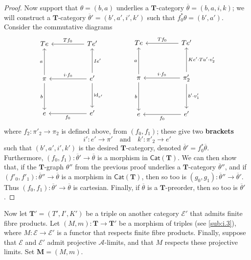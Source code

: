 \documentclass[fleqn]{article}
\newcommand{\unsure}[1]{{\color{purple}\textbf{#1}}}
\newcommand{\id}{\mathrm{id}}
\newcommand{\TT}{\mathbf{T}}
\newcommand{\MM}{\mathbf{M}}
\newcommand{\textand}{\quad\text{and}\quad}
\newcommand{\cat}[1]{\mathcal{#1}}
\newcommand{\Cat}[1]{\mathsf{#1}}
\begin{document}
\begin{proof}
  Now support that $\theta=(b,a)$ underlies a $\TT$-category $\overline{\theta}=(b,a,i,k)$;
  we will construct a $\TT$-category $\overline{\theta}'=(b',a',i',k')$ such that $f_0^*\theta=(b',a')$.
  Consider the commutative diagrams
  \[
    \begin{tikzcd}[sep=huge]
      Te
    & Te'
        \ar[l,swap,"Tf_0"]
    \\\pi
        \ar[u,"a"]
        \ar[d,swap,"b"]
    & e'
        \ar[u,swap,"Ie'"]
        \ar[l,swap,"i\cdot f_0"]
        \ar[d,"\id_{e'}"]
    \\e
    & e'
        \ar[l,"f_0"]
    \end{tikzcd}
    \qquad\qquad
    \begin{tikzcd}[sep=huge]
      Te
    & Te'
        \ar[l,swap,"Tf_0"]
    \\\pi
        \ar[u,"a"]
        \ar[d,swap,"b"]
    & \pi'_2
        \ar[u,swap,"Ke'\cdot Ta'\cdot v'_2"]
        \ar[l,swap,"i\cdot f_0"]
        \ar[d,"b'\cdot v'_1"]
    \\e
    & e'
        \ar[l,"f_0"]
    \end{tikzcd}
  \]
  where $f_2\colon\pi'_2\to\pi_2$ is defined above, from $(f_0,f_1)$;
  these give two \unsure{brackets}
  \[
    i'\colon e'\to\pi'
    \textand
    k'\colon\pi'_2\to e'
  \]
  such that $(b',a',i',k')$ is the desired $\TT$-category, denoted $\overline{\theta}'=f_0^*\overline{\theta}$.
  Furthermore, $(f_0,f_1)\colon\overline{\theta}'\to\overline{\theta}$ is a morphism in $\Cat{Cat}(\TT)$.
  We can then show that, if the $\TT$-graph $\theta''$ from the previous proof underlies a $\TT$-category $\overline{\theta}''$, and if $(f'_0,f'_1)\colon\overline{\theta}''\to\overline{\theta}$ is a morphism in $\Cat{Cat}(\TT)$, then so too is $(g_0,g_1)\colon\overline{\theta}''\to\overline{\theta}'$.
  Thus $(f_0,f_1)\colon\overline{\theta}'\to\overline{\theta}$ is cartesian.
  Finally, if $\overline{\theta}$ is a $\TT$-preorder, then so too is $\overline{\theta}'$.
\end{proof}

Now let $\TT'=(T',I',K')$ be a triple on another category $\cat{E}'$ that admits finite fibre products.
Let $(M,m)\colon\TT\to\TT'$ be a morphism of triples (see \cref{sub:i.3}), where $M\colon\cat{E}\to\cat{E}'$ is a functor that respects finite fibre products.
Finally, suppose that $\cat{E}$ and $\cat{E}'$ admit projective $\cat{A}$-limits, and that $M$ respects these projective limits.
Set $\MM=(M,m)$.
\end{document}
